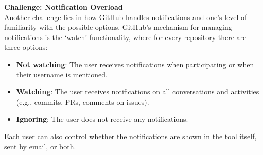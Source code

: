 
\textbf{Challenge: Notification Overload} \\
Another challenge lies in how GitHub handles notifications and one's level of familiarity with the possible options. GitHub's mechanism for managing notifications is the `watch' functionality, where for every repository there are three options:
\begin{itemize}
    \item \textbf{Not watching}: The user receives notifications when participating or when their username is mentioned.
    \item \textbf{Watching}: The user receives notifications on all conversations and activities (e.g., commits, PRs, comments on issues).
    \item \textbf{Ignoring}: The user does not receive any notifications.
\end{itemize}
Each user can also control whether the notifications are shown in the tool itself, sent by email, or both.


